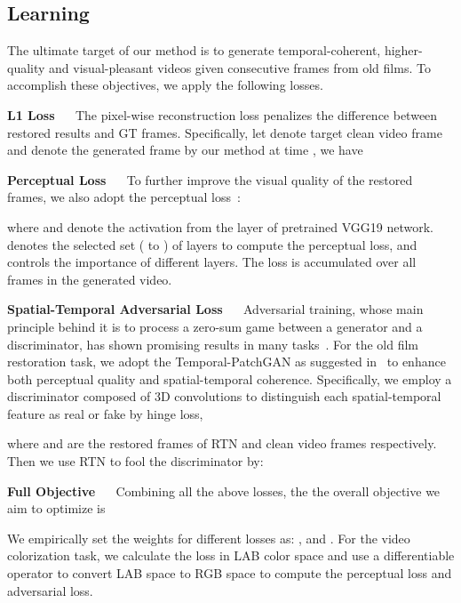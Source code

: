 \documentclass[10pt,twocolumn,letterpaper]{article}
\begin{document}
	\subsection{Learning}\label{sec3.4}
	
	The ultimate target of our method is to generate temporal-coherent, higher-quality and visual-pleasant videos given consecutive frames from old films. To accomplish these objectives, we apply the following losses.
	
	\noindent\textbf{L1 Loss}  ~~ The pixel-wise reconstruction loss  penalizes the difference between restored results and GT frames. Specifically, let  denote target clean video frame and  denote the generated frame by our method at time , we have
	
	
	
	\noindent\textbf{Perceptual Loss} ~~  To further improve the visual quality of the restored frames, we also adopt the perceptual loss~\cite{johnson2016perceptual}:
	
	
	where  and  denote the activation from the  layer of pretrained VGG19 network.  denotes the selected set ( to ) of layers to compute the perceptual loss, and  controls the importance of different layers. The loss is accumulated over all frames in the generated video.
	

	\noindent\textbf{Spatial-Temporal Adversarial Loss}  ~~  Adversarial training, whose main principle behind it is to process a zero-sum game between a generator and a discriminator, has shown promising results in many tasks~\cite{goodfellow2014generative,wan2020bringing}. For the old film restoration task, we adopt the Temporal-PatchGAN as suggested in~\cite{chang2019free} to enhance both perceptual quality and spatial-temporal coherence. Specifically, we employ a discriminator  composed of 3D convolutions to distinguish each spatial-temporal feature as real or fake by hinge loss,
	
	where  and  are the restored frames of RTN and clean video frames respectively. Then we use RTN to fool the discriminator by:
	
	
	
	\noindent\textbf{Full Objective}  ~~  Combining all the above losses, the
	the overall objective we aim to optimize is
	
	We empirically set the weights for different losses as: ,  and . For the video colorization task, we calculate the  loss in LAB color space and use a differentiable operator to convert LAB space to RGB space to compute the perceptual loss and adversarial loss. 
	
\end{document}
